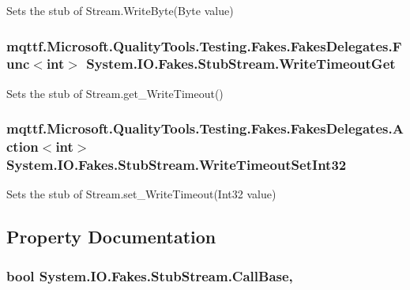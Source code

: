 Sets the stub of Stream.\-Write\-Byte(\-Byte value)

\hypertarget{class_system_1_1_i_o_1_1_fakes_1_1_stub_stream_aad365d54a4cce302980f8e71bc546a57}{
\subsubsection[{Write\-Timeout\-Get}]{\setlength{\rightskip}{0pt plus 5cm}mqttf.\-Microsoft.\-Quality\-Tools.\-Testing.\-Fakes.\-Fakes\-Delegates.\-Func$<$int$>$ System.\-I\-O.\-Fakes.\-Stub\-Stream.\-Write\-Timeout\-Get}}\label{class_system_1_1_i_o_1_1_fakes_1_1_stub_stream_aad365d54a4cce302980f8e71bc546a57}


Sets the stub of Stream.\-get\-\_\-\-Write\-Timeout()

\hypertarget{class_system_1_1_i_o_1_1_fakes_1_1_stub_stream_a75146ba4bc1eadfc3214d052a72567cb}{
\subsubsection[{Write\-Timeout\-Set\-Int32}]{\setlength{\rightskip}{0pt plus 5cm}mqttf.\-Microsoft.\-Quality\-Tools.\-Testing.\-Fakes.\-Fakes\-Delegates.\-Action$<$int$>$ System.\-I\-O.\-Fakes.\-Stub\-Stream.\-Write\-Timeout\-Set\-Int32}}\label{class_system_1_1_i_o_1_1_fakes_1_1_stub_stream_a75146ba4bc1eadfc3214d052a72567cb}


Sets the stub of Stream.\-set\-\_\-\-Write\-Timeout(\-Int32 value)



\subsection{Property Documentation}
\hypertarget{class_system_1_1_i_o_1_1_fakes_1_1_stub_stream_a152e1c23641dd93b89bd96bbb0d3618c}{
\subsubsection[{Call\-Base}]{\setlength{\rightskip}{0pt plus 5cm}bool System.\-I\-O.\-Fakes.\-Stub\-Stream.\-Call\-Base\hspace{0.3cm}{\ttfamily [get]}, {\ttfamily [set]}}}\label{class_system_1_1_i_o_1_1_fakes_1_1_stub_stream_a152e1c23641dd93b89bd96bbb0d3618c}


